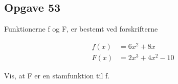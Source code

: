 \subsection{Opgave 53}

Funktionerne f og F, er bestemt ved forskrifterne

\begin{align*}
    f(x) &= 6x^2 + 8x\\
    F(x) &= 2x^3 + 4x^2 - 10
\end{align*}

Vis, at F er en stamfunktion til f.

\ans

